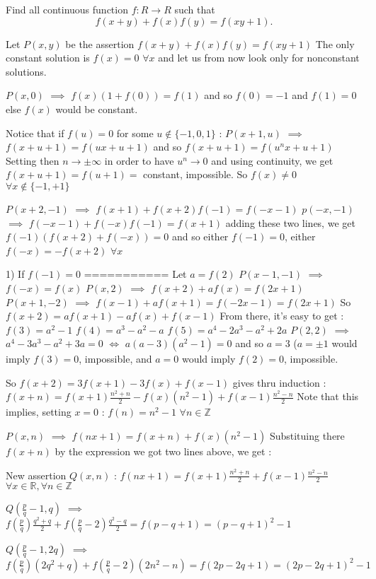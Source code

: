 \begin{solution}
	\begin{tcolorbox}Find all continuous function $f:R\rightarrow R $  such that \[ f(x+y)+f(x)f(y)=f(xy+1) .\]\end{tcolorbox}
Let $P(x,y)$ be the assertion $f(x+y)+f(x)f(y)=f(xy+1)$
The only constant solution is $f(x)=0$ $\forall x$ and let us from now look only for nonconstant solutions.

$P(x,0)$ $\implies$ $f(x)(1+f(0))=f(1)$ and so $f(0)=-1$ and $f(1)=0$ else $f(x)$ would be constant.

Notice that if $f(u)=0$ for some $u\notin\{-1,0,1\}$ : $P(x+1,u)$ $\implies$ $f(x+u+1)=f(ux+u+1)$ and so $f(x+u+1)=f(u^nx+u+1)$
Setting then $n\to\pm\infty$ in order to have $u^n\to 0$ and using continuity, we get $f(x+u+1)=f(u+1)=$ constant, impossible.
So $f(x)\ne 0$ $\forall x\notin\{-1,+1\}$

$P(x+2,-1)$ $\implies$ $f(x+1)+f(x+2)f(-1)=f(-x-1)$
$p(-x,-1)$ $\implies$ $f(-x-1)+f(-x)f(-1)=f(x+1)$
adding these two lines, we get $f(-1)(f(x+2)+f(-x))=0$ and so either $f(-1)=0$, either $f(-x)=-f(x+2)$ $\forall x$

1) If $f(-1)=0$
===========
Let $a=f(2)$
$P(x-1,-1)$ $\implies$ $f(-x)=f(x)$
$P(x,2)$ $\implies$ $f(x+2)+af(x)=f(2x+1)$
$P(x+1,-2)$ $\implies$ $f(x-1)+af(x+1)=f(-2x-1)=f(2x+1)$
So $f(x+2)=af(x+1)-af(x)+f(x-1)$
From there, it's easy to get :
$f(3)=a^2-1$
$f(4)=a^3-a^2-a$
$f(5)=a^4-2a^3-a^2+2a$
$P(2,2)$ $\implies$ $a^4-3a^3-a^2+3a=0$ $\iff$ $a(a-3)(a^2-1)=0$ and so $a=3$ ($a=\pm 1$ would imply $f(3)=0$, impossible, and $a=0$ would imply $f(2)=0$, impossible.

So $f(x+2)=3f(x+1)-3f(x)+f(x-1)$ gives thru induction : $f(x+n)=f(x+1)\frac{n^2+n}2-f(x)(n^2-1)+f(x-1)\frac{n^2-n}2$
Note that this implies, setting $x=0$ : $f(n)=n^2-1$ $\forall n\in\mathbb Z$

$P(x,n)$ $\implies$ $f(nx+1)=f(x+n)+f(x)(n^2-1)$
Substituing there $f(x+n)$ by the expression we got two lines above, we get :

New assertion $Q(x,n)$ : $f(nx+1)=f(x+1)\frac {n^2+n}2+f(x-1)\frac{n^2-n}2$ $\forall x\in\mathbb R,\forall n\in\mathbb Z$

$Q(\frac pq-1,q)$ $\implies$ $f(\frac pq)\frac {q^2+q}2+f(\frac pq-2)\frac{q^2-q}2=f(p-q+1)=(p-q+1)^2-1$

$Q(\frac pq-1,2q)$ $\implies$ $f(\frac pq)(2q^2+q)+f(\frac pq-2)(2n^2-n)=f(2p-2q+1)=(2p-2q+1)^2-1$


\end{solution}
